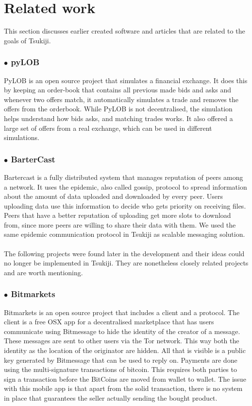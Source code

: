 \section{Related work}
This section discusses earlier created software and articles that are related to the goals of Tsukiji.

\subsubsection*{$\bullet$ pyLOB}
PyLOB \cite{pyLOB} is an open source project that simulates a financial exchange.
It does this by keeping an order-book that contains all previous made bids and asks and whenever two offers match, it automatically simulates a trade and removes the offers from the orderbook.
While PyLOB is not decentralised, the simulation helps understand how bids asks, and matching trades works.
It also offered a large set of offers from a real exchange, which can be used in different simulations.
\subsubsection*{$\bullet$ BarterCast}
Bartercast \cite{bartercast} is a fully distributed system that manages reputation of peers among a network. 
It uses the epidemic, also called gossip, protocol to spread information about the amount of data uploaded and downloaded by every peer.
Users uploading data use this information to decide who gets priority on receiving files.
Peers that have a better reputation of uploading get more slots to download from, since more peers are willing to share their data with them.
We used the same epidemic communication protocol in Tsukiji as scalable messaging solution. \\
\\
The following projects were found later in the development and their ideas could no longer be implemented in Tsukiji. 
They are nonetheless closely related projects and are worth mentioning.
\subsubsection*{$\bullet$ Bitmarkets}
Bitmarkets\cite{bitmarkets} is an open source project that includes a client and a protocol.
The client is a free OSX app for a decentralised marketplace that has users communicate using Bitmessage \cite{bitmessage} to hide the identity of the creator of a message.
These messages are sent to other users via the Tor\cite{tor} network.
This way both the identity as the location of the originator are hidden.
All that is visible is a public key generated by Bitmessage that can be used to reply on.
Payments are done using the multi-signature transactions of bitcoin.
This requires both parties to sign a transaction before the BitCoins are moved from wallet to wallet.
The issue with this mobile app is that apart from the solid transaction, there is no system in place that guarantees the seller actually sending the bought product.
